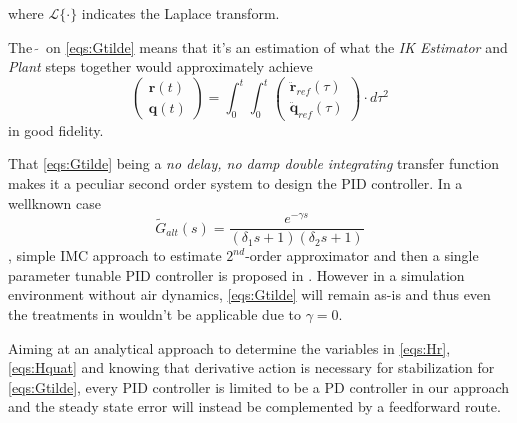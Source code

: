\documentclass[10pt]{elsarticle}
\begin{document}
where $\mathcal{L}\{\cdot\}$ indicates the Laplace transform. 

The $\, \tilde{ } \,$ on \eqref{eqs:Gtilde} means that it's an estimation of what the \textit{IK Estimator} and \textit{Plant} steps together would approximately achieve
\[
\begin{pmatrix} \boldsymbol{r}(t) \\ \boldsymbol{q}(t) \end{pmatrix} = \int_0^t \int_0^t \begin{pmatrix} \ddot{\boldsymbol{r}}_{ref}(\tau) \\ \ddot{\boldsymbol{q}}_{ref}(\tau) \end{pmatrix} \cdot d \tau^2
\]
in good fidelity. 

That \eqref{eqs:Gtilde} being a \textit{no delay, no damp double integrating} transfer function makes it a peculiar second order system to design the PID controller. In a wellknown case    
\begin{equation} \label{GtildeAlt}
  \tilde{G}_{alt}(s) = \frac{e^{-\gamma s}}{(\delta_1 s + 1)(\delta_2  s + 1)}
\end{equation}
, simple IMC approach to estimate $2^{nd}$-order approximator and then a single parameter tunable PID controller is proposed in \cite{skogestad2012simc}. However in a simulation environment without air dynamics, \eqref{eqs:Gtilde} will remain as-is and thus even the treatments in \cite{grimholt2016optimal, ruscio2017tuning} wouldn't be applicable due to $\gamma = 0$. 

Aiming at an analytical approach to determine the variables in \eqref{eqs:Hr}, \eqref{eqs:Hquat} and knowing that derivative action is necessary for stabilization for \eqref{eqs:Gtilde}\cite{grimholt2016optimal}, every PID controller is limited to be a PD controller in our approach and the steady state error will instead be complemented by a feedforward route. 
\end{document}
